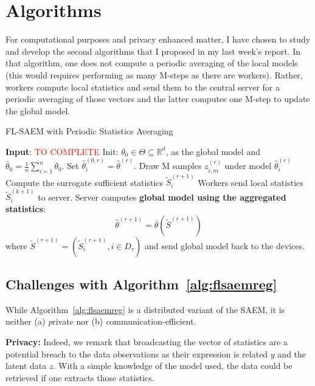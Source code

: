\documentclass[11pt]{article}
\theoremstyle{t}
\begin{document}
\clearpage
\section{Algorithms}

For computational purposes and privacy enhanced matter, I have chosen to study and develop the second algorithms that I proposed in my last week's report.
In that algorithm, one does not compute a periodic averaging of the local models (this would requires performing as many M-steps as there are workers).
Rather, workers compute local statistics and send them to the central server for a periodic averaging of those vectors and the latter computes one M-step to update the global model.

\begin{algorithm}[H]
\caption{FL-SAEM with Periodic Statistics Averaging} \label{alg:flsaemreg}
\begin{algorithmic}[1]
\STATE \textbf{Input}: \textcolor{red}{TO COMPLETE}
\STATE Init: $\theta_{0} \in \Theta \subseteq \mathbb R^d $, as the global model and $\bar{\theta}_0 =  \frac{1}{n} \sum_{i=1}^n \theta_0$.
\STATE Set $\hat{\theta}^{(0,r)}_i = \hat{\theta}^{(r)}$.
\STATE Draw M samples $z_{i,m}^{(r)}$ under model $\hat{\theta}^{(r)}_i$ \label{line:samplingreg}
\STATE Compute the surrogate sufficient statistics $\tilde{S}_{i}^{(r+1)}$ \label{line:computereg}
\STATE Workers send local statistics $\tilde{S}_{i}^{(k+1)}$ to server.
\ENDFOR
\STATE Server computes \textbf{global model using the aggregated statistics}:
$$
\hat{\theta}^{(r+1)} = \overline{\theta}( \tilde{S}^{(r+1)}) 
$$
where $\tilde{S}^{(r+1)} = (\tilde{S}_i^{(r+1)}, i \in D_r)$  and send global model back to the devices. 
\ENDFOR
\end{algorithmic}
\end{algorithm}


\subsection{Challenges with Algorithm~\ref{alg:flsaemreg}}
While Algorithm~\ref{alg:flsaemreg} is a distributed variant of the SAEM, it is neither (a) \emph private nor (b) \emph communication-efficient.

\textbf{Privacy:} Indeed, we remark that broadcasting the vector of statistics are a potential breach to the data observations as their expression is related $y$ and the latent data $z$. With a simple knowledge of the model used, the data could be retrieved if one extracts those statistics.
\end{document}

